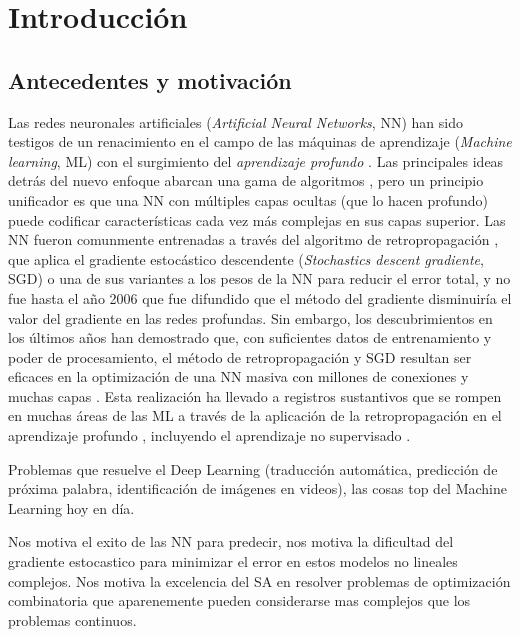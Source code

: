 \chapter{Introducción}
\section{Antecedentes y motivación}

Las redes neuronales artificiales ({\em Artificial Neural Networks}, NN) han sido testigos de un renacimiento en el campo de las máquinas de aprendizaje ({\em Machine learning}, ML) con el surgimiento del {\em aprendizaje profundo} \cite{Bengio2006, Hinton2006, Le2012, Ranzato2007}. Las principales ideas detrás del nuevo enfoque abarcan una gama de algoritmos \cite{Bengio2007, Hinton2006}, pero un principio unificador es que una NN con múltiples capas ocultas (que lo hacen profundo) puede codificar características cada vez más complejas en sus capas superior. Las NN fueron comunmente entrenadas a través del algoritmo de retropropagación \cite{Rumelhart1986b}, que aplica el gradiente estocástico descendente ({\em Stochastics descent gradiente}, SGD) o una de sus variantes a los pesos de la NN para reducir el error total, y no fue hasta el año 2006 que fue difundido que el método del gradiente disminuiría el valor del gradiente en las redes profundas. Sin embargo, los descubrimientos en los últimos años han demostrado que, con suficientes datos de entrenamiento y poder de procesamiento, el método de retropropagación y SGD resultan ser eficaces en la optimización de una NN masiva con millones de conexiones y muchas capas \cite{Ciresan2012, He2015, Le2012}. Esta realización ha llevado a registros sustantivos que se rompen en muchas áreas de las ML a través de la aplicación de la retropropagación en el aprendizaje profundo \cite{Ciresan2012, He2015, Le2012}, incluyendo el aprendizaje no supervisado \cite{Bengio2009}.


Problemas que resuelve el Deep Learning (traducción automática, predicción de próxima palabra, identificación de imágenes en videos), las cosas top del Machine Learning hoy en día.

Nos motiva el exito de las NN para predecir, nos motiva la dificultad del gradiente estocastico para minimizar el error en estos modelos no lineales complejos. Nos motiva la excelencia del SA en resolver problemas de optimización combinatoria que aparenemente pueden considerarse mas complejos que los problemas continuos.

